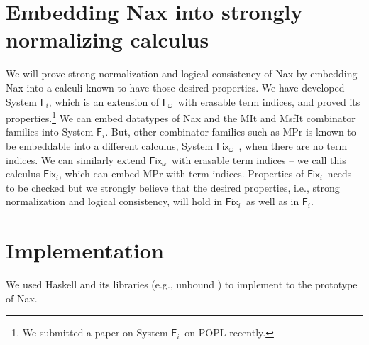 \documentclass{llncs}
\newcommand{\ie}{{i.e.}}
\newcommand{\eg}{{e.g.}}
\newcommand{\Fi}{\ensuremath{\mathsf{F}_i}}
\newcommand{\Fw}{\ensuremath{\mathsf{F}_\omega}}
\newcommand{\Fix}{\mathsf{Fix}}
\newcommand{\Fixw}{\ensuremath{\Fix_{\omega}}}
\newcommand{\Fixi}{\ensuremath{\Fix_{i}}}
\begin{document}
\section{Embedding Nax into strongly normalizing calculus}\label{sec:theory}
We will prove strong normalization and logical consistency of Nax
by embedding Nax into a calculi known to have those desired properties.
We have developed System \Fi, which is an extension of \Fw\ with 
erasable term indices, and proved its properties.\footnote{
	We submitted a paper on System \Fi\ on POPL recently.}
We can embed datatypes of Nax and the \textsf{MIt} and \textsf{MsfIt}
combinator families into System \Fi. But, other combinator families
such as \textsf{MPr} is known to be embeddable into a different
calculus, System \Fixw\ \cite{AbeMat04}, when there are no term indices.
We can similarly extend \Fixw\ with erasable term indices -- we call this
calculus \Fixi, which can embed \textsf{MPr} with term indices.
Properties of \Fixi\ needs to be checked but we strongly believe
that the desired properties, \ie, strong normalization
and logical consistency, will hold in \Fixi\ as well as in \Fi.

\section{Implementation}
We used Haskell and its libraries (\eg, unbound \cite{unbound})
to implement to the prototype of Nax.





\end{document}
